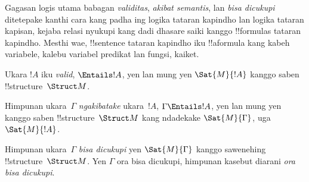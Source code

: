 \documentclass[../../../include/open-logic-section]{subfiles}
\begin{document}

\begin{explain}
Gagasan logis utama babagan \emph{validitas}, \emph{akibat
semantis}, lan \emph{bisa dicukupi} ditetepake kanthi cara kang
padha ing logika tataran kapindho lan logika tataran kapisan, kejaba
relasi nyukupi kang dadi dhasare saiki kanggo !!{formula}s
tataran kapindho. Mesthi wae, !!{sentence} tataran kapindho iku
!!a{formula} kang kabeh variabele, kalebu variabel predikat
lan fungsi, kaiket.
\end{explain}

\begin{defn}[Validitas]
Ukara $!A$ iku \emph{valid}, $\Entails !A$, yen lan mung yen
$\Sat{M}{!A}$ kanggo saben !!{structure}~$\Struct M$.
\end{defn}

\begin{defn}
Himpunan ukara~$\Gamma$ \emph{ngakibatake} ukara~$!A$,
$\Gamma \Entails !A$, yen lan mung yen kanggo saben
!!{structure}~$\Struct M$ kang ndadekake
$\Sat{M}{\Gamma}$, uga $\Sat{M}{!A}$.
\end{defn}

\begin{defn}
Himpunan ukara~$\Gamma$ \emph{bisa dicukupi} yen
$\Sat{M}{\Gamma}$ kanggo sawenehing
!!{structure}~$\Struct M$. Yen $\Gamma$ ora bisa dicukupi,
himpunan kasebut diarani \emph{ora bisa dicukupi}.
\end{defn}
\end{document}
